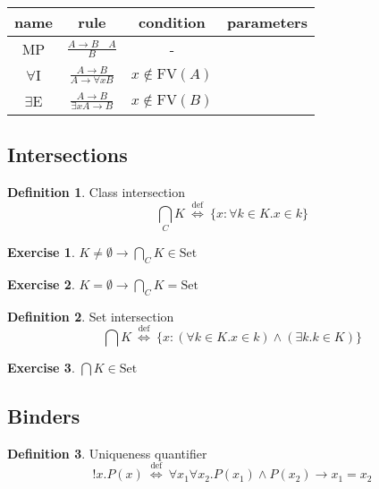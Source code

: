 \documentclass[10pt,a4paper]{article}
\theoremstyle{definition}
\newtheorem{definition}{Definition}[section]
\newtheorem{exercise}{Exercise}[section]
\newcommand{\defi}{{\mbox{def}}}
\newcommand{\propdef}{{\stackrel{\defi}{\ \Longleftrightarrow\ }}}
\newcommand{\inter}{{\bigcap}}
\newcommand{\interclass}{{{\bigcap}_C}}
\newcommand{\Set}{{\mbox{Set}}}
\begin{document}
\begin{table}[H]
\centering
\begin{tabular}{|c|c|c|c|}
\hline
name & rule & condition & parameters \\ \hline
\hline
MP &  \rule[-2.5ex]{0pt}{7ex} $\frac{A\to B\quad A}{B}$ & - \\ \hline %
\hline
\rule[-2.5ex]{0pt}{7ex}
$\forall$I & $\frac{A\to B}{A\to \forall x B}$ & $x \notin \mbox{FV}(A)$\\ \hline %
\hline
\rule[-2.5ex]{0pt}{7ex}
$\exists$E & $\frac{A\to B}{\exists x A\to B}$ & $x \notin \mbox{FV}(B)$\\ %
\hline
\end{tabular}
\end{table}

\subsection{Intersections}
\begin{definition} Class intersection
$$\interclass K \propdef \{x: \forall k\in K. x\in k\}$$
\end{definition}

\begin{exercise}
$K\neq \emptyset \to \interclass K \in \Set$
\end{exercise}

\begin{exercise}
$K=\emptyset \to \interclass K = \Set$
\end{exercise}

\begin{definition} Set intersection
$$\inter K \propdef \{x: (\forall k\in K. x\in k)\land (\exists k.k\in K)\}$$
\end{definition}

\begin{exercise}
$\inter K \in \Set$
\end{exercise}
\subsection{Binders}
\begin{definition} Uniqueness quantifier
$$!x. P(x) \propdef \forall x_1 \forall x_2. P(x_1)\land P(x_2)\to x_1=x_2$$
\end{definition}
\end{document}
